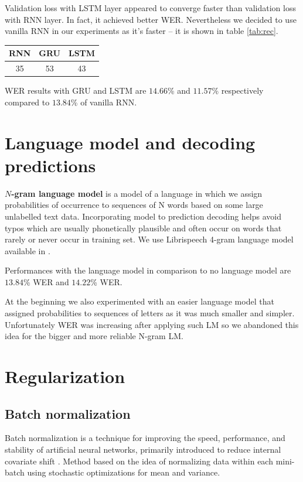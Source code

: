 \documentclass[licencjacka,en]{pracamgr}
\begin{document}
	Validation loss with LSTM layer appeared to converge faster than validation loss with RNN layer. In fact, it achieved better WER. Nevertheless we decided to use vanilla RNN in our experiments as it's faster -- it is shown in table \ref{tab:rec}.
	
	{
		\centering
		\begin{tabular}{|c|c|c|}
			\hline
			RNN & GRU & LSTM \\
			\hline
			\hline
			35 & 53 & 43 \\
			\hline
		\end{tabular}
		\label{tab:rec}
	}
	
	WER results with GRU and LSTM are $14.66$\% and $11.57$\% respectively compared to $13.84$\% of vanilla RNN.

	\section{Language model and decoding predictions}
	\textbf{$N$-gram language model} is a model of a language in which we assign probabilities of occurrence to sequences of N words based on some large unlabelled text data. Incorporating model to prediction decoding helps avoid typos which are usually phonetically plausible and often occur on words that rarely or never occur in training set. We use Librispeech 4-gram language model available in \cite{LM-LINK}.
	
	Performances with the language model in comparison to no language model are $13.84$\% WER and $14.22$\% WER.
	
	At the beginning we also experimented with an easier language model that assigned probabilities to sequences of letters as it was much smaller and simpler. Unfortunately WER was increasing after applying such LM so we abandoned this idea for the bigger and more reliable N-gram LM.
	
	\section{Regularization}
	\subsection{Batch normalization}
	Batch normalization is a technique for improving the speed, performance, and stability of artificial neural networks, primarily introduced to reduce internal covariate shift \cite{BN}. Method based on the idea of normalizing data within each mini-batch using stochastic optimizations for mean and variance.
	
\end{document}
